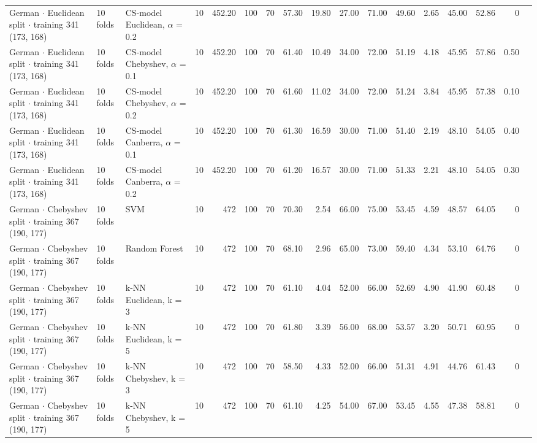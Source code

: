 \begin{longtable}{lllrrrrrrrrrrrrrl}
  German $\cdot$ Euclidean split $\cdot$ training 341 (173, 168) & 10 folds & CS-model Euclidean, $\alpha$ = 0.2 & 10 & 452.20 & 100 & 70 & 57.30 & 19.80 & 27.00 & 71.00 & 49.60 & 2.65 & 45.00 & 52.86 & 0 &  \\
  German $\cdot$ Euclidean split $\cdot$ training 341 (173, 168) & 10 folds & CS-model Chebyshev, $\alpha$ = 0.1 & 10 & 452.20 & 100 & 70 & 61.40 & 10.49 & 34.00 & 72.00 & 51.19 & 4.18 & 45.95 & 57.86 & 0.50 &  \\
  German $\cdot$ Euclidean split $\cdot$ training 341 (173, 168) & 10 folds & CS-model Chebyshev, $\alpha$ = 0.2 & 10 & 452.20 & 100 & 70 & 61.60 & 11.02 & 34.00 & 72.00 & 51.24 & 3.84 & 45.95 & 57.38 & 0.10 &  \\
  German $\cdot$ Euclidean split $\cdot$ training 341 (173, 168) & 10 folds & CS-model Canberra, $\alpha$ = 0.1 & 10 & 452.20 & 100 & 70 & 61.30 & 16.59 & 30.00 & 71.00 & 51.40 & 2.19 & 48.10 & 54.05 & 0.40 &  \\
  German $\cdot$ Euclidean split $\cdot$ training 341 (173, 168) & 10 folds & CS-model Canberra, $\alpha$ = 0.2 & 10 & 452.20 & 100 & 70 & 61.20 & 16.57 & 30.00 & 71.00 & 51.33 & 2.21 & 48.10 & 54.05 & 0.30 &  \\
  German $\cdot$ Chebyshev split $\cdot$ training 367 (190, 177) & 10 folds & SVM & 10 & 472 & 100 & 70 & 70.30 & 2.54 & 66.00 & 75.00 & 53.45 & 4.59 & 48.57 & 64.05 & 0 &  \\
  German $\cdot$ Chebyshev split $\cdot$ training 367 (190, 177) & 10 folds & Random Forest & 10 & 472 & 100 & 70 & 68.10 & 2.96 & 65.00 & 73.00 & 59.40 & 4.34 & 53.10 & 64.76 & 0 &  \\
  German $\cdot$ Chebyshev split $\cdot$ training 367 (190, 177) & 10 folds & k-NN Euclidean, k = 3 & 10 & 472 & 100 & 70 & 61.10 & 4.04 & 52.00 & 66.00 & 52.69 & 4.90 & 41.90 & 60.48 & 0 &  \\
  German $\cdot$ Chebyshev split $\cdot$ training 367 (190, 177) & 10 folds & k-NN Euclidean, k = 5 & 10 & 472 & 100 & 70 & 61.80 & 3.39 & 56.00 & 68.00 & 53.57 & 3.20 & 50.71 & 60.95 & 0 &  \\
  German $\cdot$ Chebyshev split $\cdot$ training 367 (190, 177) & 10 folds & k-NN Chebyshev, k = 3 & 10 & 472 & 100 & 70 & 58.50 & 4.33 & 52.00 & 66.00 & 51.31 & 4.91 & 44.76 & 61.43 & 0 &  \\
  German $\cdot$ Chebyshev split $\cdot$ training 367 (190, 177) & 10 folds & k-NN Chebyshev, k = 5 & 10 & 472 & 100 & 70 & 61.10 & 4.25 & 54.00 & 67.00 & 53.45 & 4.55 & 47.38 & 58.81 & 0 &  \\

\end{longtable}
